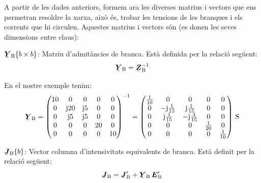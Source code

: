 A partir de les dades anteriors, formem ara les diverses matrius i
vectors que ens permetran resoldre la xarxa, aix\`{o} \'{e}s, trobar les
tensions de les branques i els corrents que hi circulen. Aquestes
matrius i vectors s\'{o}n (es donen les seves dimensions entre claus):

\begin{list}{}
{\setlength{\labelwidth}{20mm} \setlength{\leftmargin}{22mm} \setlength{\labelsep}{2mm}}
   \item[$\mcmplx{Y}\ped{B}\{b\times b\}$:] Matriu d'admit\`{a}ncies de branca. Est\`{a} definida per la relaci\'{o} seg\"{u}ent:
   \begin{equation}
      \mcmplx{Y}\ped{B} = \mcmplx{Z}\ped{B}^{-1}
   \end{equation}

   En el nostre exemple tenim:
   \[
      \mcmplx{Y}\ped{B} = \begin{pmatrix}
            10 & 0 & 0 & 0 & 0 \\
            0 & \ju 20 & \ju 5 & 0 & 0 \\
            0 & \ju 5 & \ju 5 & 0 & 0 \\
            0 & 0 & 0 & 20 & 0 \\
            0 & 0 & 0 & 0 & 10
      \end{pmatrix} ^{-1} =
      \begin{pmatrix}
            \frac{1}{10} & 0 & 0 & 0 & 0 \\
            0 & -\ju\frac{1}{15} & \ju\frac{1}{15} & 0 & 0 \\
            0 & \ju\frac{1}{15} & -\ju\frac{4}{15} & 0 & 0 \\
            0 & 0 & 0 & \frac{1}{20} & 0 \\
            0 & 0 & 0 & 0 & \frac{1}{10}
      \end{pmatrix}\unit{S}
   \]

   \item[$\mcmplx{J}\ped{B}\{b\}$:] Vector columna d'intensivitats equivalents de branca. Est\`{a} definit per la relaci\'{o} seg\"{u}ent:
   \begin{equation}
      \mcmplx{J}\ped{B} = \mcmplx{J}'\ped{B}  + \mcmplx{Y}\ped{B} \,\mcmplx{E}'\ped{B}
   \end{equation}


\end{list}
